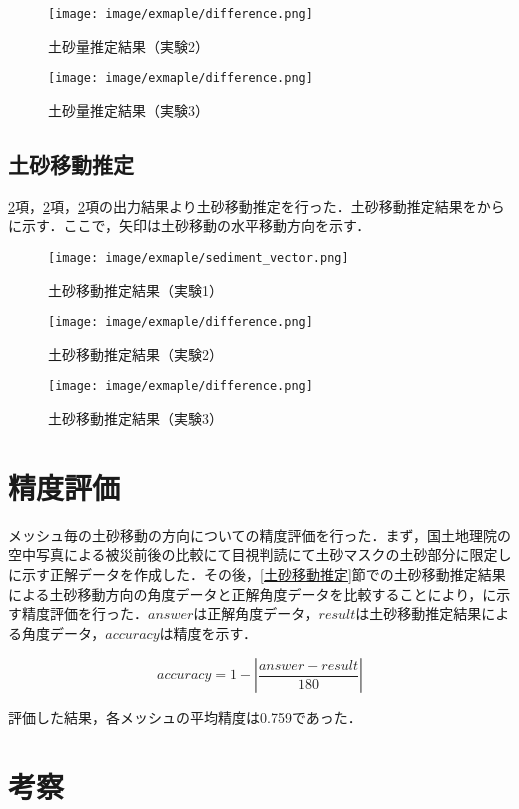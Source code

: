       \begin{figure}[t]
        \centering
        \texttt{[image: image/exmaple/difference.png]}
        \caption{土砂量推定結果（実験2）}
      \end{figure}

      \begin{figure}[t]
        \centering
        \texttt{[image: image/exmaple/difference.png]}
        \caption{土砂量推定結果（実験3）}
        \label{土砂量推定結果（実験3）}
      \end{figure}


    \subsection{土砂移動推定}
      \ref{}項，\ref{}項，\ref{}項の出力結果より土砂移動推定を行った．土砂移動推定結果をからに示す．ここで，矢印は土砂移動の水平移動方向を示す．

      \begin{figure}[t]
        \centering
        \texttt{[image: image/exmaple/sediment\_vector.png]}
        \caption{土砂移動推定結果（実験1）}
        \label{土砂移動推定結果（実験1）}
      \end{figure}

      \begin{figure}[t]
        \centering
        \texttt{[image: image/exmaple/difference.png]}
        \caption{土砂移動推定結果（実験2）}
      \end{figure}

      \begin{figure}[t]
        \centering
        \texttt{[image: image/exmaple/difference.png]}
        \caption{土砂移動推定結果（実験3）}
        \label{土砂移動推定結果（実験3）}
      \end{figure}


  \section{精度評価}
    メッシュ毎の土砂移動の方向についての精度評価を行った．まず，国土地理院の空中写真による被災前後の比較\cite{国土地理院空撮画像1, 国土地理院空撮画像2}にて目視判読にて土砂マスクの土砂部分に限定しに示す正解データを作成した．その後，\ref{土砂移動推定}節での土砂移動推定結果による土砂移動方向の角度データと正解角度データを比較することにより，に示す精度評価を行った．$answer$は正解角度データ，$result$は土砂移動推定結果による角度データ，$accuracy$は精度を示す．
    
    \begin{equation}
      \label{精度評価}
      accuracy = 1 - |\dfrac{answer - result} {180}|
    \end{equation}

    評価した結果，各メッシュの平均精度は0.759であった．


    
  \section{考察}
